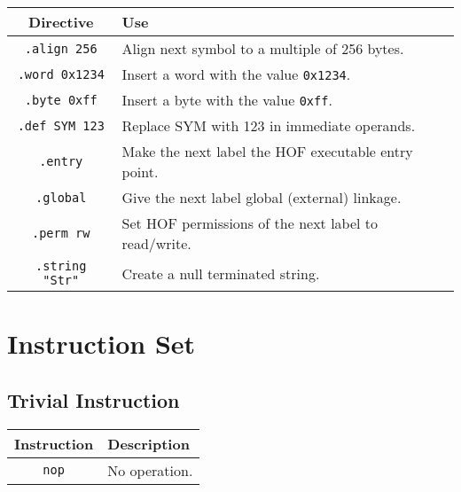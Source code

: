 \documentclass[10pt,letterpaper]{article}
\begin{document}
\begin{center}
\begin{tabular}{cl}
\textbf{Directive}&\textbf{Use}\\
\hline
\texttt{.align 256}    &Align next symbol to a multiple of 256 bytes.\\
\texttt{.word 0x1234}  &Insert a word with the value \texttt{0x1234}.\\
\texttt{.byte 0xff}    &Insert a byte with the value \texttt{0xff}.\\
\texttt{.def SYM 123}  &Replace SYM with 123 in immediate operands.\\
\texttt{.entry}        &Make the next label the HOF executable entry point.\\
\texttt{.global}       &Give the next label global (external) linkage.\\
\texttt{.perm rw}      &Set HOF permissions of the next label to read/write.\\
\texttt{.string "Str"} &Create a null terminated string.\\
\end{tabular}
\end{center}

\section{Instruction Set}
\subsection{Trivial Instruction}
\begin{center}
\begin{tabular}{cl}
\textbf{Instruction}&\textbf{Description}\\
\hline
\texttt{nop}&No operation.\\
\end{tabular}
\end{center}
\end{document}
